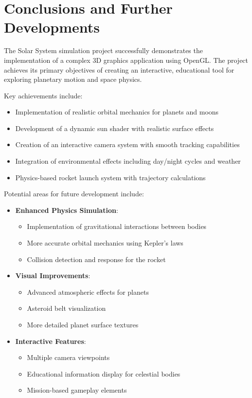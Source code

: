 \documentclass[12pt]{report}
\begin{document}
\chapter{Conclusions and Further Developments}

The Solar System simulation project successfully demonstrates the implementation of a complex 3D graphics application using OpenGL. The project achieves its primary objectives of creating an interactive, educational tool for exploring planetary motion and space physics.

Key achievements include:
\begin{itemize}
    \item Implementation of realistic orbital mechanics for planets and moons
    \item Development of a dynamic sun shader with realistic surface effects
    \item Creation of an interactive camera system with smooth tracking capabilities
    \item Integration of environmental effects including day/night cycles and weather
    \item Physics-based rocket launch system with trajectory calculations
\end{itemize}

Potential areas for future development include:
\begin{itemize}
    \item \textbf{Enhanced Physics Simulation}:
        \begin{itemize}
            \item Implementation of gravitational interactions between bodies
            \item More accurate orbital mechanics using Kepler's laws
            \item Collision detection and response for the rocket
        \end{itemize}
    \item \textbf{Visual Improvements}:
        \begin{itemize}
            \item Advanced atmospheric effects for planets
            \item Asteroid belt visualization
            \item More detailed planet surface textures
        \end{itemize}
    \item \textbf{Interactive Features}:
        \begin{itemize}
            \item Multiple camera viewpoints
            \item Educational information display for celestial bodies
            \item Mission-based gameplay elements
        \end{itemize}
\end{itemize}
\end{document}
